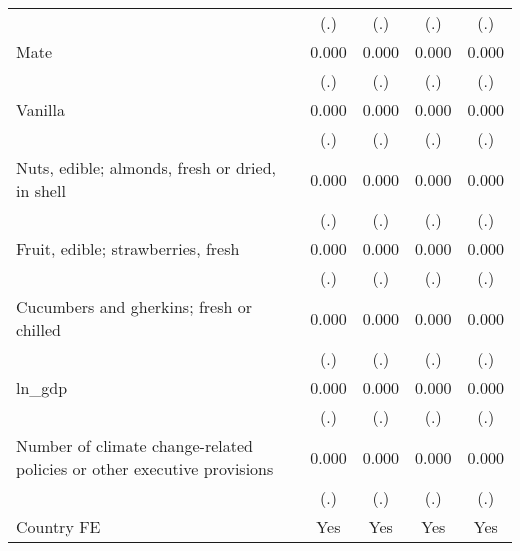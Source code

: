 \begin{table}[htbp]
\begin{tabular}{l*{4}{c}}
                    &         (.)         &         (.)         &         (.)         &         (.)         \\
\addlinespace
Mate                &       0.000         &       0.000         &       0.000         &       0.000         \\
                    &         (.)         &         (.)         &         (.)         &         (.)         \\
\addlinespace
Vanilla             &       0.000         &       0.000         &       0.000         &       0.000         \\
                    &         (.)         &         (.)         &         (.)         &         (.)         \\
\addlinespace
Nuts, edible; almonds, fresh or dried, in shell&       0.000         &       0.000         &       0.000         &       0.000         \\
                    &         (.)         &         (.)         &         (.)         &         (.)         \\
\addlinespace
Fruit, edible; strawberries, fresh&       0.000         &       0.000         &       0.000         &       0.000         \\
                    &         (.)         &         (.)         &         (.)         &         (.)         \\
\addlinespace
Cucumbers and gherkins; fresh or chilled&       0.000         &       0.000         &       0.000         &       0.000         \\
                    &         (.)         &         (.)         &         (.)         &         (.)         \\
\addlinespace
ln\_gdp              &       0.000         &       0.000         &       0.000         &       0.000         \\
                    &         (.)         &         (.)         &         (.)         &         (.)         \\
\addlinespace
Number of climate change-related policies or other executive provisions&       0.000         &       0.000         &       0.000         &       0.000         \\
                    &         (.)         &         (.)         &         (.)         &         (.)         \\
\addlinespace
Country FE          &         Yes         &         Yes         &         Yes         &         Yes         \\

\end{tabular}
\end{table}
